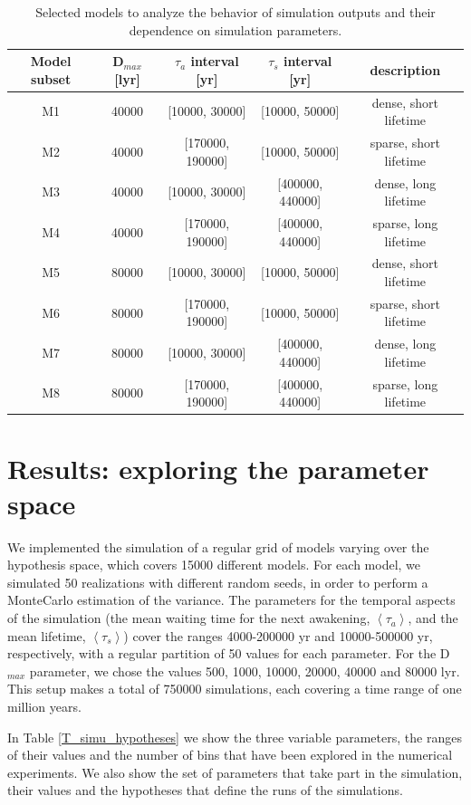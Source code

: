 \documentclass[crop]{CSLB}
\newcommand{\ttn}[1]{}
\begin{document}
\setlength{\tabcolsep}{10pt}
\begin{table}
\centering
\begin{tabular}{ccccc}
\hline
   Model subset & D$_{max}$ [lyr] & $\tau_a$ interval [yr] & $\tau_s$ interval 
   [yr]& description  \\
\hline
M1 & 40000 & [10000, 30000]   & [10000, 50000]   &dense, short lifetime\\
M2 & 40000 & [170000, 190000] & [10000, 50000]   &sparse, short lifetime\\
M3 & 40000 & [10000, 30000]   & [400000, 440000] &dense, long lifetime \\
M4 & 40000 & [170000, 190000] & [400000, 440000] &sparse, long lifetime\\
%
M5 & 80000 & [10000, 30000]   & [10000, 50000]   &dense, short lifetime\\
M6 & 80000 & [170000, 190000] & [10000, 50000]   &sparse, short lifetime\\
M7 & 80000 & [10000, 30000]   & [400000, 440000] &dense, long lifetime \\
M8 & 80000 & [170000, 190000] & [400000, 440000] &sparse, long lifetime\\
%
\hline
\end{tabular}
\caption{Selected models to analyze the behavior of simulation outputs
   and their dependence on simulation parameters.}
\label{T_selected_models}
\end{table}

 


\section{Results: exploring the parameter space}\label{S_results}

We implemented the simulation of a regular grid of models varying over
the hypothesis space, which covers 15000 different models.
%
For each model, we simulated 50 realizations with different random
seeds, in order to perform a MonteCarlo estimation of the variance.
%
The parameters for the temporal aspects of the simulation (the mean
waiting time for the next awakening, $\left<\tau_a\right>$, and the
mean lifetime, $\left<\tau_s\right>$) cover the ranges 4000-200000 yr
and 10000-500000 yr, respectively, with a regular partition of 50
values for each parameter.
%
For the D$_{max}$ parameter, we chose the values 500, 1000, 10000,
20000, 40000 and 80000 lyr.
%
This setup makes a total of 750000 simulations, each covering a time
range of one million years.
%
\ttn{1}
%
In Table \ref{T_simu_hypotheses} we show the three variable
parameters, the ranges of their values and the number of bins that
have been explored in the numerical experiments.
%
We also show the set of parameters that take part in the simulation,
their values and the hypotheses that define the runs of the
simulations.
\end{document}
